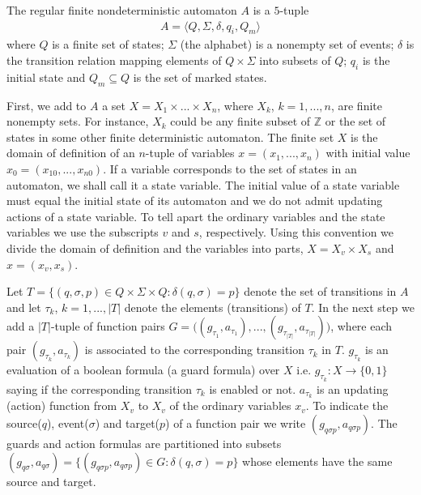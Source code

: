 \documentclass{article}
\begin{document}
The regular finite nondeterministic automaton
$A$ is a $5$-tuple
\begin{eqnarray}
A=\langle Q,\Sigma,\delta, q_i,Q_m \rangle\nonumber
\end{eqnarray} where $Q$ is a finite set of states; $\Sigma$ (the alphabet) is a nonempty
set of events; $\delta$ is the transition relation mapping elements of $Q\times\Sigma$ into subsets of $Q$; $q_i$ is the
initial state and $Q_m \subseteq Q$ is the set of marked states.




First, we add to $A$ a set $X=X_1\times ... \times X_n$, where
$X_k$, $k=1,...,n$, are finite nonempty sets. For instance, $X_k$
could be any finite subset of $\mathbb{Z}$ or the set of states in  some
other finite deterministic automaton. The finite set $X$ is the
domain of definition of an $n$-tuple of variables
$x=(x_1,...,x_n)$ with initial value $x_0=(x_{10},...,x_{n0})$. If
a variable corresponds to the set of states in an automaton, we
shall call it a state variable. The initial value of a state
variable must equal the initial state of its automaton and we do
not admit updating actions of a state variable. To tell apart the
ordinary variables and the state variables we use the subscripts
$v$ and $s$, respectively. Using this convention we divide the
domain of definition and the variables into parts, $X=X_v \times
X_s$ and $x=(x_v,x_s)$.

 Let $T=\{(q,\sigma,p)\in Q \times \Sigma\times Q:
\delta(q,\sigma)=p\}$ denote the set of transitions in $A$ and let
$\tau_k$, $k=1,...,|T|$ denote the elements (transitions) of $T$. In the next step we
 add a $|T|$-tuple of function pairs $G=\big((g_{\tau_1},a_{\tau_1}),...,
(g_{\tau_{|T|}},a_{\tau_{|T|}})\big)$, where each pair
$(g_{\tau_k},a_{\tau_k})$ is associated to the corresponding
transition $\tau_k$ in $T$. $g_{\tau_k}$ is an evaluation of a
boolean formula (a guard formula) over $X$ i.e. $g_{\tau_k}:X
\rightarrow \{0,1\}$ saying if the corresponding transition
$\tau_k$ is enabled or not. $a_{\tau_k}$ is an updating (action)
function from $X_v$ to $X_v$ of the ordinary variables $x_v$. To
indicate the source($q$), event($\sigma$) and target($p$) of a
function pair we write $(g_{q\sigma p},a_{q\sigma p})$. The guards and
action formulas are partitioned into subsets $(g_{q\sigma},a_{q\sigma})=\{(g_{q\sigma p},a_{q\sigma p})\in G:
\delta(q,\sigma)=p\}$ whose elements have the same source and target.
\end{document}
